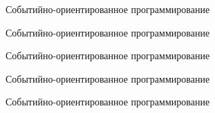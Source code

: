 \documentclass[aspectratio=169]{beamer}
\begin{document}
\begin{frame}{Событийно-ориентированное программирование}

\end{frame}
\begin{frame}{Событийно-ориентированное программирование}

\end{frame}
\begin{frame}{Событийно-ориентированное программирование}

\end{frame}
\begin{frame}{Событийно-ориентированное программирование}

\end{frame}
\begin{frame}{Событийно-ориентированное программирование}

\end{frame}
\end{document}
